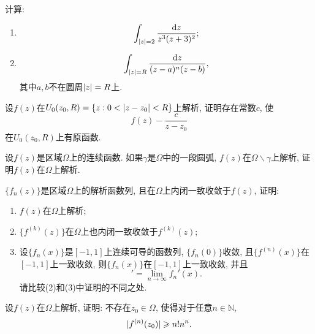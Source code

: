 \begin{yyEx}
    计算:\begin{enumerate}
        \item \begin{equation*}
            \int_{\lvert z\rvert = 2}\frac{\mathrm{d}z}{z^3(z+3)^2};
        \end{equation*}
        \item \begin{equation*}
            \int_{\lvert z\rvert=R}\frac{\mathrm{d}z}{(z-a)^n(z-b)},
        \end{equation*}
        其中$a,b$不在圆周$\lvert z\rvert = R$上.
    \end{enumerate}
\end{yyEx}

\begin{yyEx}
    设$f(z)$在$U_0(z_0,R) = \{z:0<\lvert z-z_0\rvert<R \}$上解析, 证明存在常数$c$, 使\begin{equation*}
        f(z)-\frac{c}{z-z_0}
    \end{equation*}
    在$U_0(z_0,R)$上有原函数.
\end{yyEx}

\begin{yyEx}
    设$f(z)$是区域$\Omega$上的连续函数. 如果$\gamma$是$\Omega$中的一段圆弧, $f(z)$在$\Omega\backslash\gamma$上解析, 证明$f(z)$在$\Omega$上解析.
\end{yyEx}

\begin{yyEx}
    $\{f_n(z)\}$是区域$\Omega$上的解析函数列, 且在$\Omega$上内闭一致收敛于$f(z)$, 证明:
    \begin{enumerate}
        \item $f(z)$在$\Omega$上解析;
        \item $\{f^{(k)}(z)\}$在$\Omega$上也内闭一致收敛于$f^{(k)}(z)$;
        \item 设$\{f_n(x)\}$是$[-1,1]$上连续可导的函数列, $\{f_n(0)\}$收敛, 且$\{f^{(n)}(x)\}$在$[-1,1]$上一致收敛, 则$\{f_n(x)\}$在$[-1,1]$上一致收敛, 并且
        \begin{equation*}
            [\lim_{n\to\infty}f_n(x)]' = \lim_{n\to\infty}f_n'(x).
        \end{equation*}
        请比较(2)和(3)中证明的不同之处.
    \end{enumerate}
\end{yyEx}

\begin{yyEx}
    设$f(z)$在$\Omega$上解析, 证明: 不存在$z_0\in\Omega$, 使得对于任意$n\in\mathbb{N}$,\begin{equation*}
        \lvert f^{(n)}(z_0)\rvert\geqslant n!n^n.
    \end{equation*}
\end{yyEx}

